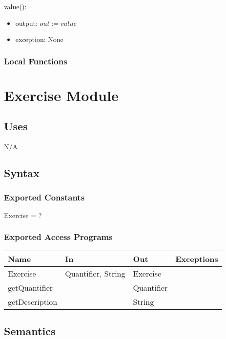 \documentclass[12pt, titlepage]{article}
\begin{document}
value():
\begin{itemize}
	\item output: $out := value$
	\item exception: None
\end{itemize}

\subsubsection{Local Functions}


\newpage

\section{Exercise Module}

\subsection{Uses}
N/A

\subsection{Syntax}

\subsubsection{Exported Constants}
Exercise = ?
\subsubsection{Exported Access Programs}

\begin{center}
	\begin{tabular}{p{2cm} p{4cm} p{4cm} p{2cm}}
		\hline
		\textbf{Name} & \textbf{In} & \textbf{Out} & \textbf{Exceptions} \\
		\hline
		Exercise & Quantifier, String & Exercise &  \\
		getQuantifier &  & Quantifier &  \\
		getDescription & & String & \\
		\hline
	\end{tabular}
\end{center}

\subsection{Semantics}
\end{document}
